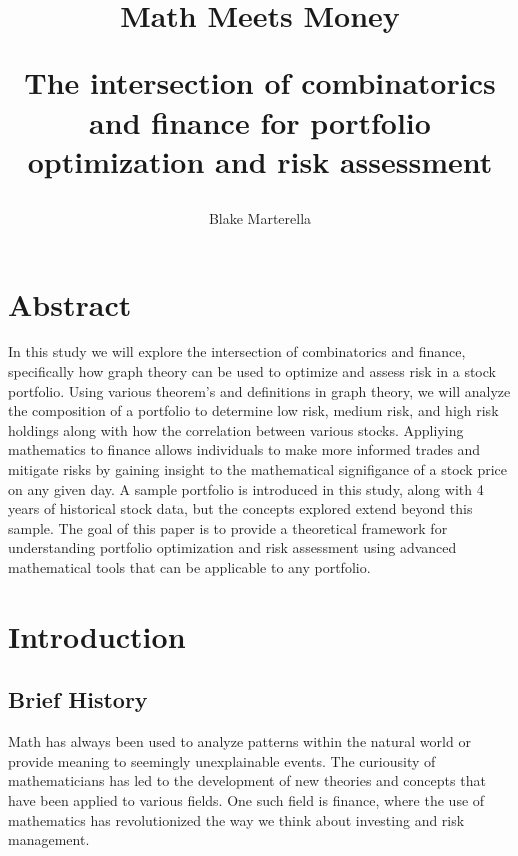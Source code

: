 \documentclass{article}
\begin{document}
\title{
 Math Meets Money \\ 
\begin{large} 
The intersection of combinatorics and finance for portfolio optimization and risk assessment
\end{large} }
\author{Blake Marterella}
\date{}

\maketitle

\section*{Abstract}

In this study we will explore the intersection of combinatorics and finance, specifically how graph theory can be used to optimize and assess risk in a stock portfolio. Using various theorem's and definitions in graph theory, we will analyze the composition of a portfolio to determine low risk, medium risk, and high risk holdings along with how the correlation between various stocks. Appliying mathematics to finance allows individuals to make more informed trades and mitigate risks by gaining insight to the mathematical signifigance of a stock price on any given day. A sample portfolio is introduced in this study, along with 4 years of historical stock data, but the concepts explored extend beyond this sample. The goal of this paper is to provide a theoretical framework for understanding portfolio optimization and risk assessment using advanced mathematical tools that can be applicable to any portfolio.

\tableofcontents

\section{Introduction}

\subsection{Brief History}

Math has always been used to analyze patterns within the natural world or provide meaning to seemingly unexplainable events. The curiousity of mathematicians has led to the development of new theories and concepts that have been applied to various fields. One such field is finance, where the use of mathematics has revolutionized the way we think about investing and risk management.
\end{document}
